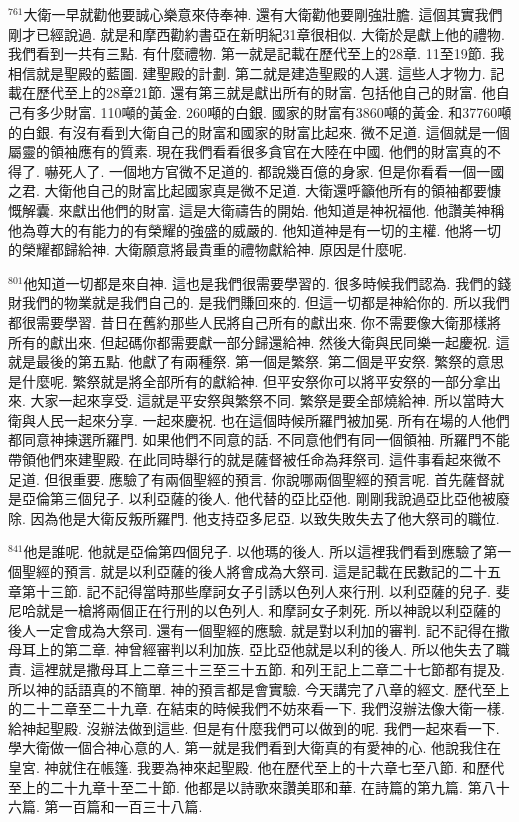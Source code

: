 \documentclass{book}
\begin{document}
$^{761}$大衛一早就勸他要誠心樂意來侍奉神.
還有大衛勸他要剛強壯膽.
這個其實我們剛才已經說過.
就是和摩西勸約書亞在新明紀31章很相似.
大衛於是獻上他的禮物.
我們看到一共有三點.
有什麼禮物.
第一就是記載在歷代至上的28章.
11至19節.
我相信就是聖殿的藍圖.
建聖殿的計劃.
第二就是建造聖殿的人選.
這些人才物力.
記載在歷代至上的28章21節.
還有第三就是獻出所有的財富.
包括他自己的財富.
他自己有多少財富.
110噸的黃金.
260噸的白銀.
國家的財富有3860噸的黃金.
和37760噸的白銀.
有沒有看到大衛自己的財富和國家的財富比起來.
微不足道.
這個就是一個屬靈的領袖應有的質素.
現在我們看看很多貪官在大陸在中國.
他們的財富真的不得了.
嚇死人了.
一個地方官微不足道的.
都說幾百億的身家.
但是你看看一個一國之君.
大衛他自己的財富比起國家真是微不足道.
大衛還呼籲他所有的領袖都要慷慨解囊.
來獻出他們的財富.
這是大衛禱告的開始.
他知道是神祝福他.
他讚美神稱他為尊大的有能力的有榮耀的強盛的威嚴的.
他知道神是有一切的主權.
他將一切的榮耀都歸給神.
大衛願意將最貴重的禮物獻給神.
原因是什麼呢.

$^{801}$他知道一切都是來自神.
這也是我們很需要學習的.
很多時候我們認為.
我們的錢財我們的物業就是我們自己的.
是我們賺回來的.
但這一切都是神給你的.
所以我們都很需要學習.
昔日在舊約那些人民將自己所有的獻出來.
你不需要像大衛那樣將所有的獻出來.
但起碼你都需要獻一部分歸還給神.
然後大衛與民同樂一起慶祝.
這就是最後的第五點.
他獻了有兩種祭.
第一個是繁祭.
第二個是平安祭.
繁祭的意思是什麼呢.
繁祭就是將全部所有的獻給神.
但平安祭你可以將平安祭的一部分拿出來.
大家一起來享受.
這就是平安祭與繁祭不同.
繁祭是要全部燒給神.
所以當時大衛與人民一起來分享.
一起來慶祝.
也在這個時候所羅門被加冕.
所有在場的人他們都同意神揀選所羅門.
如果他們不同意的話.
不同意他們有同一個領袖.
所羅門不能帶領他們來建聖殿.
在此同時舉行的就是薩督被任命為拜祭司.
這件事看起來微不足道.
但很重要.
應驗了有兩個聖經的預言.
你說哪兩個聖經的預言呢.
首先薩督就是亞倫第三個兒子.
以利亞薩的後人.
他代替的亞比亞他.
剛剛我說過亞比亞他被廢除.
因為他是大衛反叛所羅門.
他支持亞多尼亞.
以致失敗失去了他大祭司的職位.

$^{841}$他是誰呢.
他就是亞倫第四個兒子.
以他瑪的後人.
所以這裡我們看到應驗了第一個聖經的預言.
就是以利亞薩的後人將會成為大祭司.
這是記載在民數記的二十五章第十三節.
記不記得當時那些摩訶女子引誘以色列人來行刑.
以利亞薩的兒子.
斐尼哈就是一槍將兩個正在行刑的以色列人.
和摩訶女子刺死.
所以神說以利亞薩的後人一定會成為大祭司.
還有一個聖經的應驗.
就是對以利加的審判.
記不記得在撒母耳上的第二章.
神曾經審判以利加族.
亞比亞他就是以利的後人.
所以他失去了職責.
這裡就是撒母耳上二章三十三至三十五節.
和列王記上二章二十七節都有提及.
所以神的話語真的不簡單.
神的預言都是會實驗.
今天講完了八章的經文.
歷代至上的二十二章至二十九章.
在結束的時候我們不妨來看一下.
我們沒辦法像大衛一樣.
給神起聖殿.
沒辦法做到這些.
但是有什麼我們可以做到的呢.
我們一起來看一下.
學大衛做一個合神心意的人.
第一就是我們看到大衛真的有愛神的心.
他說我住在皇宮.
神就住在帳篷.
我要為神來起聖殿.
他在歷代至上的十六章七至八節.
和歷代至上的二十九章十至二十節.
他都是以詩歌來讚美耶和華.
在詩篇的第九篇.
第八十六篇.
第一百篇和一百三十八篇.
\end{document}
